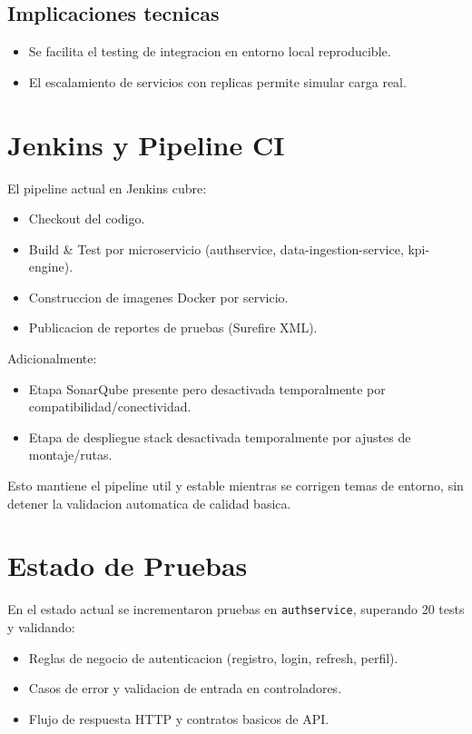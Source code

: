 \documentclass[12pt,a4paper]{article}
\begin{document}
\subsection{Implicaciones tecnicas}
\begin{itemize}[leftmargin=*]
    \item Se facilita el testing de integracion en entorno local reproducible.
    \item El escalamiento de servicios con replicas permite simular carga real.
\end{itemize}

\section{Jenkins y Pipeline CI}
El pipeline actual en Jenkins cubre:
\begin{itemize}[leftmargin=*]
    \item Checkout del codigo.
    \item Build \& Test por microservicio (authservice, data-ingestion-service, kpi-engine).
    \item Construccion de imagenes Docker por servicio.
    \item Publicacion de reportes de pruebas (Surefire XML).
\end{itemize}

Adicionalmente:
\begin{itemize}[leftmargin=*]
    \item Etapa SonarQube presente pero desactivada temporalmente por compatibilidad/conectividad.
    \item Etapa de despliegue stack desactivada temporalmente por ajustes de montaje/rutas.
\end{itemize}

Esto mantiene el pipeline util y estable mientras se corrigen temas de entorno, sin detener la validacion automatica de calidad basica.

\section{Estado de Pruebas}
En el estado actual se incrementaron pruebas en \texttt{authservice}, superando 20 tests y validando:
\begin{itemize}[leftmargin=*]
    \item Reglas de negocio de autenticacion (registro, login, refresh, perfil).
    \item Casos de error y validacion de entrada en controladores.
    \item Flujo de respuesta HTTP y contratos basicos de API.
\end{itemize}
\end{document}
